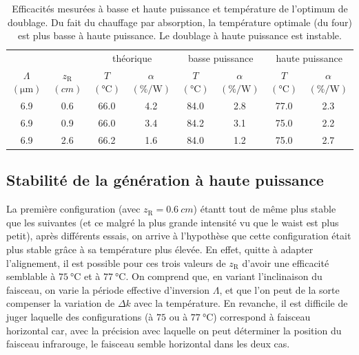 \documentclass[11pt,a4paper]{article}
\newcommand{\ra}[1]{\renewcommand{\arraystretch}{#1}}
\newcommand{\zr}{z_\mathsc{R}}
\newcommand{\mathsc}[1]{\mathrm{\scriptscriptstyle {#1}}}
\begin{document}
\begin{table}[htpb]
\centering
\ra{1.3}
\begin{tabular}{@{}cccccccc@{}} \toprule
 &  & \multicolumn{2}{c}{théorique} & \multicolumn{2}{c}{basse puissance} & \multicolumn{2}{c}{haute puissance} \\ 
 \cmidrule(r){3-4} \cmidrule(lr){5-6} \cmidrule(l){7-8} 
 $\Lambda$ $(\unit{\micro\meter})$ & $\zr$ $(\unit{cm})$ & $T$ $(\unit{\celsius})$ & $\alpha$ $(\unit{\percent\per\watt})$& $T$ $(\unit{\celsius})$ & $\alpha$ $(\unit{\percent\per\watt})$ & $T$ $(\unit{\celsius})$ & $\alpha$ $(\unit{\percent\per\watt})$   \\ \midrule
 6.9       & 0.6  & 66.0  & 4.2      & 84.0 & 2.8      & 77.0 & 2.3      \\
 6.9       & 0.9  & 66.0  & 3.4      & 84.2 & 3.1      & 75.0 & 2.2      \\
 6.9       & 2.6  & 66.2  & 1.6      & 84.0 & 1.2      & 75.0   & 2.7      \\ \bottomrule 
\end{tabular}
\caption{Efficacités mesurées à basse et haute puissance et température de l'optimum de doublage. \small Du fait du chauffage par absorption, la température optimale (du four) est plus basse à haute puissance. Le doublage à haute puissance est instable.} %
\label{table:mes}
\end{table}

\subsection{Stabilité de la génération à haute puissance}

La première configuration (avec $\zr=\SI{0.6}{cm}$) étantt tout de même plus stable que les suivantes (et ce malgré la plus grande intensité vu que le waist est plus petit), après différents essais, on arrive à l'hypothèse que cette configuration était plus stable grâce à sa température plus élevée. En effet, quitte à adapter l'alignement, il est possible pour ces trois valeurs de $\zr$ d'avoir une efficacité semblable à $\SI{75}{\celsius}$ et à $\SI{77}{\celsius}$. On comprend que, en variant l'inclinaison du faisceau, on varie la période effective d'inversion $\Lambda$, et que l'on peut de la sorte compenser la variation de $\Delta k$ avec la température. En revanche, il est difficile de juger laquelle des configurations (à $75$ ou à $\SI{77}{\celsius}$) correspond à faisceau horizontal car, avec la précision avec laquelle on peut déterminer la position du faisceau infrarouge, le faisceau semble horizontal dans les deux cas. 
\end{document}
